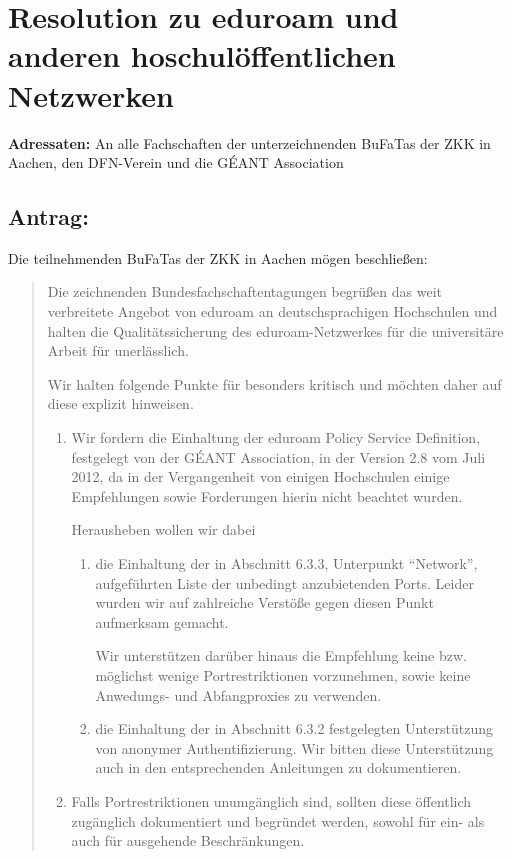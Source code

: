\documentclass[12pt,oneside]{scrartcl}
\begin{document}
\section*{Resolution zu eduroam und anderen hoschulöffentlichen Netzwerken}

\textbf{Adressaten:} An alle Fachschaften der unterzeichnenden BuFaTas der ZKK
in Aachen, den DFN-Verein und die GÉANT Association

\subsection*{Antrag:}
Die teilnehmenden BuFaTas der ZKK in Aachen mögen beschließen:
\begin{quote}
  Die zeichnenden Bundesfachschaftentagungen begrüßen das weit verbreitete
  Angebot von eduroam an deutschsprachigen Hochschulen und halten die
  Qualitätssicherung des eduroam-Netzwerkes für die universitäre Arbeit für
  unerlässlich.

  Wir halten folgende Punkte für besonders kritisch und möchten daher auf diese
  explizit hinweisen.

  \begin{enumerate}
  \item Wir fordern die Einhaltung der eduroam Policy Service Definition,
    festgelegt von der GÉANT Association, in der Version 2.8 vom Juli 2012, da
    in der Vergangenheit von einigen Hochschulen einige Empfehlungen sowie
    Forderungen hierin nicht beachtet wurden.

    Herausheben wollen wir dabei
    \begin{enumerate}
    \item  die Einhaltung der in Abschnitt 6.3.3, Unterpunkt "`Network"',
      aufgeführten Liste der unbedingt anzubietenden Ports. Leider wurden wir
      auf zahlreiche Verstöße gegen diesen Punkt aufmerksam gemacht.

      Wir unterstützen darüber hinaus die Empfehlung keine
      bzw. möglichst wenige Portrestriktionen vorzunehmen, sowie keine
      Anwedungs- und Abfangproxies zu verwenden.

    \item die Einhaltung der in Abschnitt 6.3.2 festgelegten Unterstützung von
      anonymer Authentifizierung. Wir bitten diese Unterstützung auch in den
      entsprechenden Anleitungen zu dokumentieren.
    \end{enumerate}
  \item Falls Portrestriktionen unumgänglich sind, sollten diese öffentlich
    zugänglich dokumentiert und begründet werden, sowohl für ein- als auch für
    ausgehende Beschränkungen.


\end{enumerate}
\end{quote}
\end{document}

